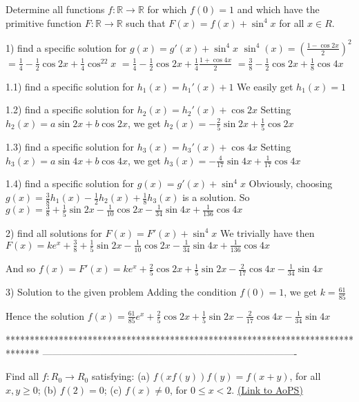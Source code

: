 \begin{solution}
	\begin{tcolorbox}Determine all functions $f: \mathbb{R}\to\mathbb{R}$ for which $f(0)=1$ and which have the primitive function $F: \mathbb{R}\to\mathbb{R}$ such that $F(x)=f(x)+\sin^4{x}$ for all $x{\in}R$.\end{tcolorbox}
1) find a specific solution for $g(x)=g'(x)+\sin^4x$
$\sin^4(x)=\left(\frac{1-\cos 2x}2\right)^2$ $=\frac 14-\frac 12\cos 2x+\frac 14\cos^22x$ $=\frac 14-\frac 12\cos 2x+\frac 14\frac{1+\cos 4x}2$ $=\frac 38-\frac 12\cos 2x+\frac 18\cos 4x$ 

1.1) find a specific solution for $h_1(x)=h_1'(x)+1$
We easily get $h_1(x)=1$

1.2) find a specific solution for $h_2(x)=h_2'(x)+\cos 2x$
Setting $h_2(x)=a\sin 2x + b\cos 2x$, we get $h_2(x)=-\frac 25\sin 2x+\frac 15\cos 2x$

1.3) find a specific solution for $h_3(x)=h_3'(x)+\cos 4x$
Setting $h_3(x)=a\sin 4x + b\cos 4x$, we get $h_3(x)=-\frac 4{17}\sin 4x+\frac 1{17}\cos 4x$

1.4) find a specific solution for $g(x)=g'(x)+\sin^4x$
Obviously, choosing $g(x)=\frac 38h_1(x)-\frac 12h_2(x)+\frac 18h_3(x)$ is a solution.
So $g(x)=\frac 38+\frac 15\sin 2x-\frac 1{10}\cos 2x-\frac 1{34}\sin 4x+\frac 1{136}\cos 4x$

2) find all solutions for $F(x)=F'(x)+\sin^4x$
We trivially have then $F(x)=ke^x+\frac 38+\frac 15\sin 2x-\frac 1{10}\cos 2x-\frac 1{34}\sin 4x+\frac 1{136}\cos 4x$

And so $f(x)=F'(x)=ke^x+\frac 25\cos 2x+\frac 1{5}\sin 2x-\frac 2{17}\cos 4x-\frac 1{34}\sin 4x$

3) Solution to the given problem
Adding the condition $f(0)=1$, we get $k=\frac{61}{85}$

Hence the solution $\boxed{f(x)=\frac{61}{85}e^x+\frac 25\cos 2x+\frac 1{5}\sin 2x-\frac 2{17}\cos 4x-\frac 1{34}\sin 4x}$
\end{solution}
*******************************************************************************
-------------------------------------------------------------------------------

\begin{problem}
	Find all $f:R_0 \to R_0$ satisfying:
(a) $f(xf(y))f(y)=f(x+y)$, for all $x,y \ge 0$;
(b) $f(2)=0$;
(c) $f(x) \ne 0$, for $0 \le x < 2$.
	\flushright \href{https://artofproblemsolving.com/community/c6h619236}{(Link to AoPS)}
\end{problem}



